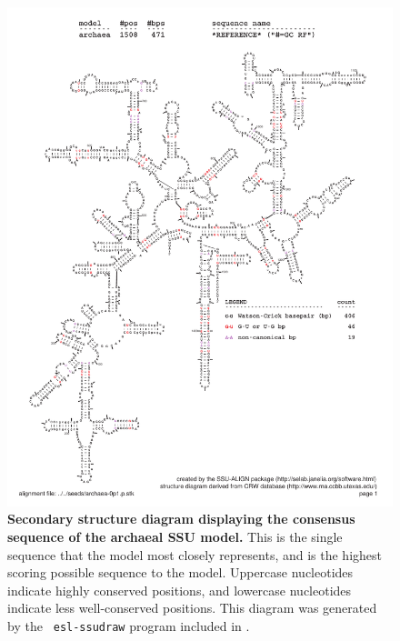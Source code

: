 \vspace{0.2in}
\newpage

\begin{figure}
\begin{center}
\includegraphics[width=5.7in]{Figures/archaea-0p1-rf}
\end{center}
\caption[Secondary structure diagram displaying the consensus sequence
  of the archaeal SSU model]{\textbf{Secondary structure diagram displaying the
  consensus sequence of the archaeal SSU model.} 
  This is the single sequence that the model 
  most closely represents, and is the highest scoring possible
  sequence to the model. Uppercase nucleotides indicate highly conserved positions,
  and lowercase nucleotides indicate less well-conserved positions.
  This diagram was generated by the {\tt
  esl-ssudraw} program included in .}
\label{fig:arcrf}
\end{figure}

